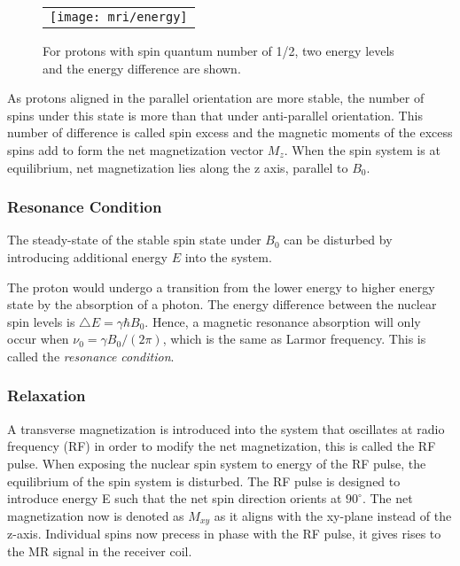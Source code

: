 \begin{figure}[htb]
\begin{center}
\begin{tabular}{c}
\texttt{[image: mri/energy]}
\end{tabular}
\caption{For protons with spin quantum number of 1/2, two energy
levels and the energy difference are shown.} \label{fig:energy}
\end{center}
\end{figure}

As protons aligned in the parallel orientation are more stable, the number of spins under this state is more than that under anti-parallel orientation. This number of difference is called spin excess and the magnetic moments of the excess spins add to form the net magnetization vector $M_z$. When the spin system is at equilibrium, net magnetization lies along the z axis, parallel to $B_0$.

\subsubsection{Resonance Condition}

The steady-state of the stable spin state under $B_0 $ can be disturbed by introducing additional energy $E$ into the system. 

The proton would undergo a transition from the lower energy to higher energy state by the absorption of a photon. The energy difference between the nuclear spin levels is $\bigtriangleup E = \gamma \hbar B_0$. Hence, a magnetic resonance absorption will only occur when $\nu_0 = \gamma B_0/(2 \pi)$, which is the same as Larmor frequency. This is called the \textit{resonance condition}. 

\subsubsection{Relaxation}
A transverse magnetization is introduced into the system that oscillates at radio frequency (RF) in order to modify the net magnetization, this is called the RF pulse. When exposing the nuclear spin system to energy of the RF pulse, the equilibrium of the spin system is disturbed. The RF pulse is designed to introduce energy E such that the net spin direction orients at $90^\circ$. The net magnetization now is denoted as $M_{xy}$ as it aligns with the xy-plane instead of the z-axis. Individual spins now precess in phase with the RF pulse, it gives rises to the MR signal in the receiver coil. 

